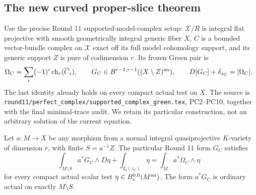 \subsection{The new curved proper-slice theorem}

Use the precise Round 11 supported-model-complex setup:
$\mathcal X/R$ is integral flat projective with smooth geometrically
integral generic fiber $X$, $C$ is a bounded vector-bundle complex on
$\mathcal X$ exact off its full model cohomology support, and its generic
support $Z$ is pure of codimension $r$. Its frozen Green pair is
\[
 \Omega_C=\sum_i(-1)^i\operatorname{ch}_r(\overline C_i),
 \qquad G_C\in B^{r-1,r-1}((X\setminus Z)^{\rm an}),
 \qquad D[G_C]+\delta_{z_C}=[\Omega_C].
\]
The last identity already holds on every compact actual test on $X$.
The source is \texttt{round11/perfect\_complex/supported\_complex\_green.tex},
PC2--PC10, together with the final minimal-trace audit. We retain its
particular construction, not an arbitrary solution of the current equation.

\begin{theorem}
\label{r16h:curved-slice}
Let $a:M\to X$ be any morphism from a normal integral quasiprojective
$K$-variety of dimension $r$, with finite $S=a^{-1}Z$. The particular
Round 11 form $G_C$ satisfies
\[
 \int_{M\setminus S}a^*G_C\wedge D\eta
       +\int_{I_a(z_C)}\eta
       =\int_M a^*\Omega_C\wedge\eta
 \tag{H16.4}\label{r16h:curved-slice-eq}
\]
for every compact actual scalar test $\eta\in B_c^{0,0}(M^{\rm an})$.
The form $a^*G_C$ is ordinary actual on exactly $M\setminus S$.
\end{theorem}

